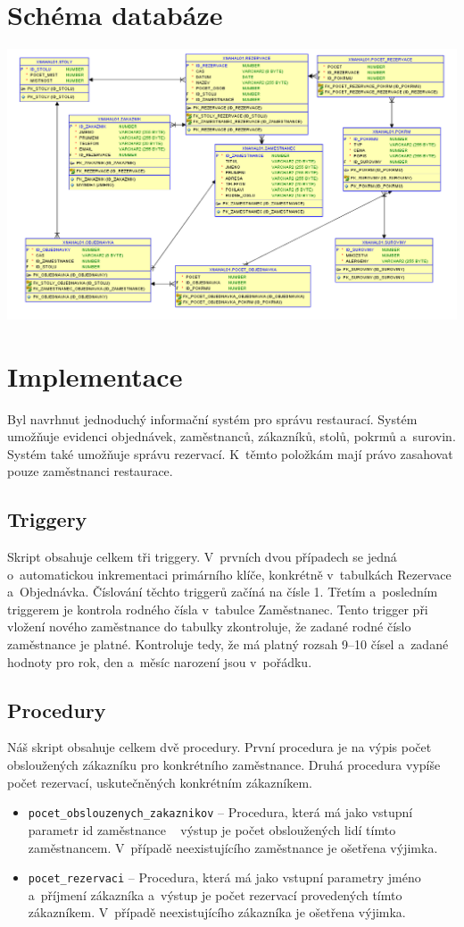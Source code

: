 \documentclass[a4paper, 12pt]{article}
\begin{document}
\section{Schéma databáze}
\begin{center}
\includegraphics[width=190mm]{schema.png}
\end{center}
\newpage
\section{Implementace}
Byl navrhnut jednoduchý informační systém pro správu restaurací. Systém umožňuje evidenci objednávek, zaměstnanců, zákazníků, stolů, pokrmů a~surovin. Systém také umožňuje správu rezervací. K~těmto položkám mají právo zasahovat pouze zaměstnanci restaurace. 
\subsection{Triggery}
Skript obsahuje celkem tři triggery. V~prvních dvou případech se jedná o~automatickou inkrementaci primárního klíče, konkrétně v~tabulkách Rezervace a~Objednávka. Číslování těchto triggerů začíná na čísle 1. Třetím a~posledním triggerem je kontrola rodného čísla v~tabulce Zaměstnanec. Tento trigger při vložení nového zaměstnance do tabulky zkontroluje, že zadané rodné číslo zaměstnance je platné. Kontroluje tedy, že má platný rozsah 9--10 čísel a~zadané hodnoty pro rok, den a~měsíc narození jsou v~pořádku.
\subsection{Procedury}
Náš skript obsahuje celkem dvě procedury. První procedura je na výpis počet obsloužených zákazníku pro konkrétního zaměstnance. Druhá procedura vypíše počet rezervací, uskutečněných konkrétním zákazníkem.
\begin{itemize}
\item \verb|pocet_obslouzenych_zakaznikov| -- Procedura, která má jako vstupní parametr id zaměstnance ~ výstup je počet obsloužených lidí tímto zaměstnancem. V~případě neexistujícího zaměstnance je ošetřena výjimka.
\item \verb|pocet_rezervaci| -- Procedura, která má jako vstupní parametry jméno a~příjmení zákazníka a~výstup je počet rezervací provedených tímto zákazníkem. V~případě neexistujícího zákazníka je ošetřena výjimka.  
\end{itemize}
\end{document}
